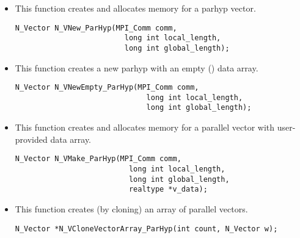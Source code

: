 \begin{itemize}


\item  {}
  
  This function creates and allocates memory for a parhyp vector.
 
  

\begin{verbatim}
N_Vector N_VNew_ParHyp(MPI_Comm comm, 
                         long int local_length, 
                         long int global_length);
\end{verbatim}
  

\item {}
 
  This function creates a new parhyp  with an empty () data array.
 
  

\begin{verbatim}
N_Vector N_VNewEmpty_ParHyp(MPI_Comm comm, 
                              long int local_length, 
                              long int global_length);
\end{verbatim}

  

\item {}
  
  This function creates and allocates memory for a parallel vector
  with user-provided data array.
 
  

\begin{verbatim}
N_Vector N_VMake_ParHyp(MPI_Comm comm, 
                          long int local_length,
                          long int global_length,
                          realtype *v_data);
\end{verbatim}


\item {}
 
  This function creates (by cloning) an array of  parallel vectors.
 
\begin{verbatim}
N_Vector *N_VCloneVectorArray_ParHyp(int count, N_Vector w);
\end{verbatim}


\end{itemize}

